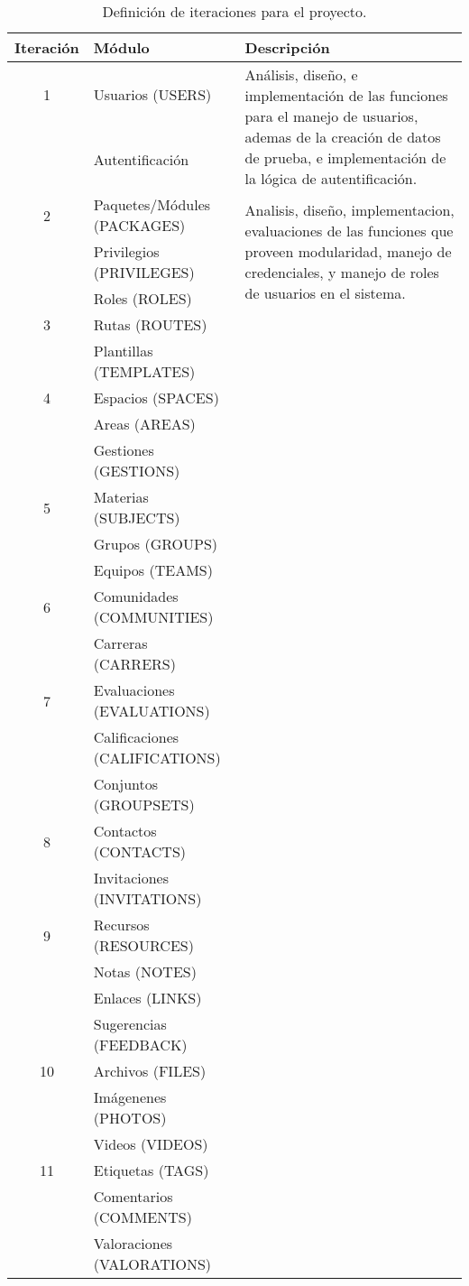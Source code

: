 \begin{table}
\centering
\begin{tabular}{|c|l|p{8.0cm}|}
\hline
Iteración & Módulo & Descripción \\
\hline
1 & Usuarios (USERS) & \multirow{2}{8cm}{Análisis, diseño, e implementación de
las funciones para el manejo de usuarios, ademas de la creación de datos de
prueba, e implementación de la lógica de autentificación.}\\
  & Autentificación \\
\hline
2 & Paquetes/Módules (PACKAGES) & \multirow{3}{8cm}{Analisis, diseño, implementacion, evaluaciones de las funciones que proveen modularidad, manejo de credenciales, y manejo de roles de usuarios en el sistema.}\\
  & Privilegios (PRIVILEGES) \\
  & Roles (ROLES) \\
\hline
3 & Rutas (ROUTES) \\
  & Plantillas (TEMPLATES) \\
\hline
4 & Espacios (SPACES) \\
  & Areas (AREAS) \\
  & Gestiones (GESTIONS) \\
\hline
5 & Materias (SUBJECTS) \\
  & Grupos (GROUPS) \\
  & Equipos (TEAMS) \\
\hline
6 & Comunidades (COMMUNITIES) \\
  & Carreras (CARRERS) \\
\hline
7 & Evaluaciones (EVALUATIONS) \\
  & Calificaciones (CALIFICATIONS) \\
  & Conjuntos (GROUPSETS) \\
\hline
8 & Contactos (CONTACTS) \\
  & Invitaciones (INVITATIONS) \\
\hline
9 & Recursos (RESOURCES) \\
  & Notas (NOTES) \\
  & Enlaces (LINKS) \\
  & Sugerencias (FEEDBACK) \\
\hline
10 & Archivos (FILES) \\
   & Imágenenes (PHOTOS) \\
   & Videos (VIDEOS) \\
\hline
11 & Etiquetas (TAGS) \\
   & Comentarios (COMMENTS) \\
   & Valoraciones (VALORATIONS) \\
\hline
\end{tabular}
\caption{Definición de iteraciones para el proyecto.}
\label{iteraciones}
\end{table}

